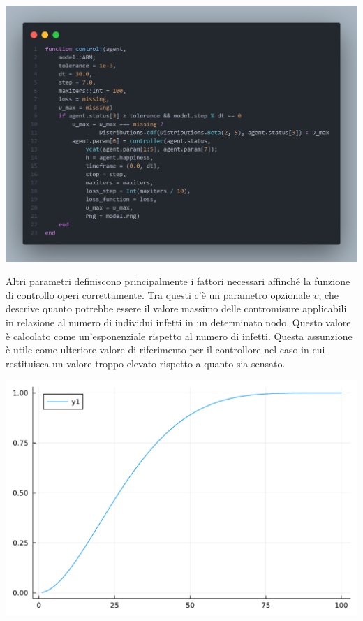 \begin{minipage}{\linewidth}
	\centering
	\includegraphics[width=\textwidth]{img/controller_neuralode.png}
	\label{fig:controller_abm}
\end{minipage}

Altri parametri definiscono principalmente i fattori necessari affinché 
la funzione di controllo operi correttamente. Tra questi c'è un parametro 
opzionale $\upsilon$, che descrive quanto potrebbe essere il valore 
massimo delle contromisure applicabili in relazione al numero di 
individui infetti in un determinato nodo. Questo valore è calcolato 
come un'esponenziale rispetto al numero di infetti. Questa assunzione 
è utile come ulteriore valore di riferimento per il controllore nel 
caso in cui restituisca un valore troppo elevato rispetto a quanto 
sia sensato.

\begin{minipage}{\linewidth}
	\centering
	\includegraphics[width=\textwidth]{img/beta_cdf.pdf}
	\label{fig:max_countermeasures_function_abm}
\end{minipage}


